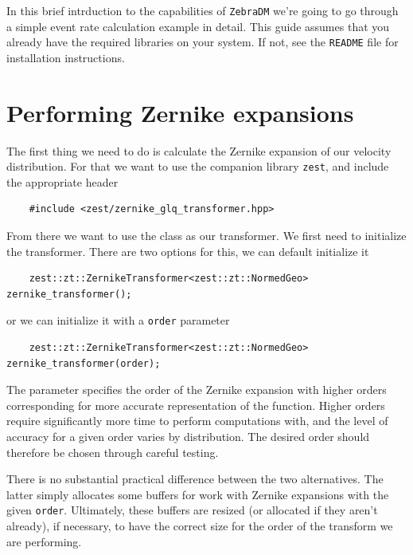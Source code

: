 \documentclass{article}
\begin{document}
In this brief intrduction to the capabilities of \texttt{ZebraDM} we're going to go through a simple event rate calculation example in detail. This guide assumes that you already have the required libraries on your system. If not, see the \texttt{README} file for installation instructions.

\section{Performing Zernike expansions}

The first thing we need to do is calculate the Zernike expansion of our velocity distribution. For that we want to use the companion library \texttt{zest}, and include the appropriate header
\begin{verbatim}
    #include <zest/zernike_glq_transformer.hpp>
\end{verbatim}
From there we want to use the class  as our transformer. We first need to initialize the transformer. There are two options for this, we can default initialize it
\begin{verbatim}
    zest::zt::ZernikeTransformer<zest::zt::NormedGeo> zernike_transformer();
\end{verbatim}
or we can initialize it with a \texttt{order} parameter
\begin{verbatim}
    zest::zt::ZernikeTransformer<zest::zt::NormedGeo> zernike_transformer(order);
\end{verbatim}
The parameter  specifies the order of the Zernike expansion with higher orders corresponding for more accurate representation of the function. Higher orders require significantly more time to perform computations with, and the level of accuracy for a given order varies by distribution. The desired order should therefore be chosen through careful testing.

There is no substantial practical difference between the two alternatives. The latter simply allocates some buffers for work with Zernike expansions with the given \texttt{order}. Ultimately, these buffers are resized (or allocated if they aren't already), if necessary, to have the correct size for the order of the transform we are performing.
\end{document}
